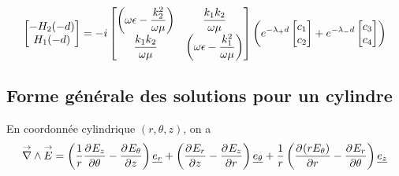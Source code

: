 \begin{multline}
    \begin{bmatrix}
        -H_2(-d)\\
        H_1(-d)\\
    \end{bmatrix}
    =
    -i\begin{bmatrix}
        \left(\w\eps-\frac{k_2^2}{\w\mu}\right)& \frac{k_1k_2}{\w\mu} \\
        \frac{k_1k_2}{\w\mu}& \left(\w\eps-\frac{k_1^2}{\w\mu}\right) \\
    \end{bmatrix}
    \left(
    e^{-\lambda_+ d} 
        \begin{bmatrix}
        c_1\\
        c_2
    \end{bmatrix} + 
    e^{-\lambda_- d}
    \begin{bmatrix}
        c_3 \\
        c_4 \\
    \end{bmatrix}
    \right)
\end{multline}













\subsection{Forme générale des solutions pour un cylindre}

\newcommand{\mr}{r}
\newcommand{\mt}{\theta}
\newcommand{\mz}{z}

\begin{figure}[htpb]
\centering
\begin{tikzpicture}

\end{tikzpicture}
\end{figure}

En coordonnée cylindrique $(r,\theta,z)$, on a
\begin{equation}
\vrot \vE = \left(\frac{1}{r}\ddr{\theta}{E_z} - \ddr{z}{E_\theta}\right)\v{e_r} + 
\left(\ddr{z}{E_r} - \ddr{r}{E_z}\right)\v{e_\theta} +
\frac{1}{r}\left(\ddr{r}{(rE_\theta)}-\ddr{\theta}{E_r}\right)\v{e_z}
\end{equation}

